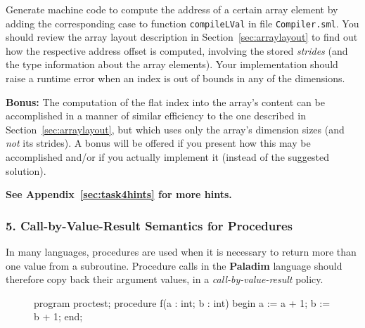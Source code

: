 \documentclass[12pt,a4paper]{article}
\newcommand{\paladim}{\textbf{Paladim}\xspace}
\begin{document}
{%
Generate machine code to compute the address of a certain array
            element by adding the corresponding case to function \texttt{compileLVal}
            in file \texttt{Compiler.sml}.
%
            You should review the array layout description
            in Section~\ref{sec:arraylayout} to find out how the respective address
            offset is computed, involving the stored \emph{strides} (and the
            type information about the array elements).
            Your implementation should raise a runtime error when an index
            is out of bounds in any of the dimensions.

\textbf{Bonus:} The computation of the flat index into the array's content can be
            accomplished in a manner of similar efficiency to the one described
            in Section~\ref{sec:arraylayout}, but which uses only the array's
            dimension sizes (and {\em not} its strides).   A bonus will be offered
            if you present how this may be accomplished and/or if you actually
            implement it (instead of the suggested solution).

{\bf See Appendix~\ref{sec:task4hints} for more hints.}

\subsubsection*{5. Call-by-Value-Result Semantics for Procedures}

In many languages, procedures are used when it is necessary to return
more than one value from a subroutine.
Procedure calls in the \paladim language should therefore copy back their
argument values, in a \emph{call-by-value-result} policy.

\begin{figure}
\vspace*{-4ex}
\begin{code}[frame=lines,fontsize=\scriptsize,label=\textit{DATA/proctest.pal}]
program proctest;
procedure f(a : int; b : int)
begin a := a + 1; b := b + 1; end;


\end{code}
\end{figure}}
\end{document}
